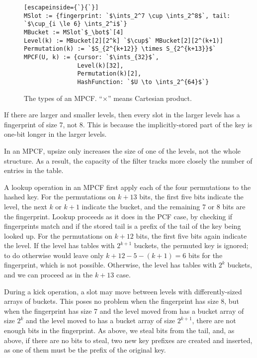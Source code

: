 \documentclass[letterpaper, 11pt]{article}
\newcommand{\ints}{\mathbb{Z}}
\begin{document}
\begin{figure}
\begin{lstlisting}[escapeinside={`}{`}]
MSlot := {fingerprint: `$\ints_2^7 \cup \ints_2^8$`, tail: `$\cup_{i \le 6} \ints_2^i$`}
MBucket := MSlot`$_\bot$`[4]
Level(k) := MBucket[2][2^k] `$\cup$` MBucket[2][2^(k+1)]
Permutation(k) := `$S_{2^{k+12}} \times S_{2^{k+13}}$`
MPCF(U, k) := {cursor: `$\ints_{32}$`,
               Level(k)[32],
               Permutation(k)[2],
               HashFunction: `$U \to \ints_2^{64}$`}

\end{lstlisting}
\caption{The types of an MPCF.
``$\times$'' means Cartesian product.
}
\end{figure}

If there are larger and smaller levels, then every slot in the larger levels has a fingerprint of size 7, not 8.
This is because the implicitly-stored part of the key is one-bit longer in the larger levels.

In an MPCF, upsize only increases the size of one of the levels, not the whole structure.
As a result, the capacity of the filter tracks more closely the number of entries in the table.

A lookup operation in an MPCF first apply each of the four permutations to the hashed key.
For the permutations on $k + 13$ bits, the first five bits indicate the level, the next $k$ or $k+1$ indicate the bucket, and the remaining 7 or 8 bits are the fingerprint.
Lookup proceeds as it does in the PCF case, by checking if fingerprints match and if the stored tail is a prefix of the tail of the key being looked up.
For the permutations on $k + 12$ bits, the first five bits again indicate the level.
If the level has tables with $2^{k+1}$ buckets, the permuted key is ignored; to do otherwise would leave only $k+12 - 5 - (k+1) = 6$ bits for the fingerprint, which is not possible.
Otherwise, the level has tables with $2^k$ buckets, and we can proceed as in the $k+13$ case.


During a kick operation, a slot may move between levels with differently-sized arrays of buckets.
This poses no problem when the fingerprint has size 8, but when the fingerprint has size 7 and the level moved from has a bucket array of size $2^k$ and the level moved to has a bucket array of size $2^{k+1}$,  there are not enough bits in the fingerprint.
As above, we steal bits from the tail, and, as above, if there are no bits to steal, two new key prefixes are created and inserted, as one of them must be the prefix of the original key.
\end{document}
